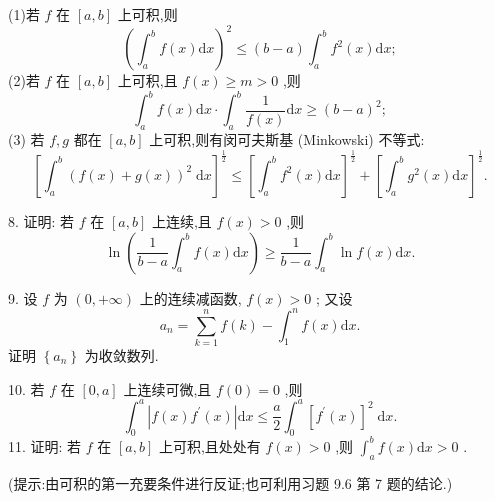 (1)若 \(f\) 在 \(\left\lbrack  {a,b}\right\rbrack\) 上可积,则
\[
{\left( {\int }_{a}^{b}f\left( x\right) \mathrm{d}x\right) }^{2} \leq  \left( {b - a}\right) {\int }_{a}^{b}{f}^{2}\left( x\right) \mathrm{d}x;
\]
(2)若 \(f\) 在 \(\left\lbrack  {a,b}\right\rbrack\) 上可积,且 \(f\left( x\right)  \geq  m > 0\) ,则
\[
{\int }_{a}^{b}f\left( x\right) \mathrm{d}x \cdot  {\int }_{a}^{b}\frac{1}{f\left( x\right) }\mathrm{d}x \geq  {\left( b - a\right) }^{2};
\]
(3) 若 \(f,g\) 都在 \(\left\lbrack  {a,b}\right\rbrack\) 上可积,则有闵可夫斯基 (Minkowski) 不等式:
\[
{\left\lbrack  {\int }_{a}^{b}{\left( f\left( x\right)  + g\left( x\right) \right) }^{2}\mathrm{\;d}x\right\rbrack  }^{\frac{1}{2}} \leq  {\left\lbrack  {\int }_{a}^{b}{f}^{2}\left( x\right) \mathrm{d}x\right\rbrack  }^{\frac{1}{2}} + {\left\lbrack  {\int }_{a}^{b}{g}^{2}\left( x\right) \mathrm{d}x\right\rbrack  }^{\frac{1}{2}}.
\]

8. 证明: 若 \(f\) 在 \(\left\lbrack  {a,b}\right\rbrack\) 上连续,且 \(f\left( x\right)  > 0\) ,则
\[
\ln \left( {\frac{1}{b - a}{\int }_{a}^{b}f\left( x\right) \mathrm{d}x}\right)  \geq  \frac{1}{b - a}{\int }_{a}^{b}\ln f\left( x\right) \mathrm{d}x.
\]

9. 设 \(f\) 为 \(\left( {0, + \infty }\right)\) 上的连续减函数, \(f\left( x\right)  > 0\) ; 又设
\[
{a}_{n} = \mathop{\sum }\limits_{{k = 1}}^{n}f\left( k\right)  - {\int }_{1}^{n}f\left( x\right) \mathrm{d}x.
\]
证明 \(\left\{  {a}_{n}\right\}\) 为收敛数列.

10. 若 \(f\) 在 \(\left\lbrack  {0,a}\right\rbrack\) 上连续可微,且 \(f\left( 0\right)  = 0\) ,则
\[
{\int }_{0}^{a}\left| {f\left( x\right) {f}^{\prime }\left( x\right) }\right| \mathrm{d}x \leq  \frac{a}{2}{\int }_{0}^{a}{\left\lbrack  {f}^{\prime }\left( x\right) \right\rbrack  }^{2}\mathrm{\;d}x.
\]
11. 证明: 若 \(f\) 在 \(\left\lbrack  {a,b}\right\rbrack\) 上可积,且处处有 \(f\left( x\right)  > 0\) ,则 \({\int }_{a}^{b}f\left( x\right) \mathrm{d}x > 0\) .

(提示:由可积的第一充要条件进行反证;也可利用习题 9.6 第 7 题的结论.)

